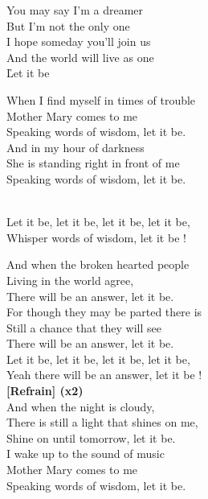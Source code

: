 \documentclass{novel}
\begin{document}
You may say I'm a dreamer\\
But I'm not the only one\\
I hope someday you'll join us\\
And the world will live as one\\

\newpage
\normalsize
\h*{Let it be}

When I find myself in times of trouble\\
Mother Mary comes to me\\
Speaking words of wisdom, let it be.\\

And in my hour of darkness\\
She is standing right in front of me\\
Speaking words of wisdom, let it be.\\

\begin{bfseries}
[Refrain:]\\
Let it be, let it be, let it be, let it be,\\
Whisper words of wisdom, let it be !\\

\end{bfseries}

And when the broken hearted people\\
Living in the world agree,\\
There will be an answer, let it be.\\

For though they may be parted there is\\
Still a chance that they will see\\
There will be an answer, let it be.\\

Let it be, let it be, let it be, let it be,\\
Yeah there will be an answer, let it be !\\

\textbf{[Refrain] (x2)}\\

And when the night is cloudy,\\
There is still a light that shines on me,\\
Shine on until tomorrow, let it be.\\

I wake up to the sound of music\\
Mother Mary comes to me\\
Speaking words of wisdom, let it be.\\
\end{document}

